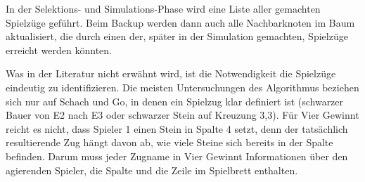 In der Selektions- und Simulations-Phase wird eine Liste aller gemachten Spielzüge geführt. Beim Backup werden dann auch alle Nachbarknoten im Baum aktualisiert, die durch einen der, später in der Simulation gemachten, Spielzüge erreicht werden könnten.

Was in der Literatur nicht erwähnt wird, ist die Notwendigkeit die Spielzüge eindeutig zu identifizieren. Die meisten Untersuchungen des Algorithmus beziehen sich nur auf Schach und Go, in denen ein Spielzug klar definiert ist (schwarzer Bauer von E2 nach E3 oder schwarzer Stein auf Kreuzung 3,3).
Für Vier Gewinnt reicht es nicht, dass Spieler 1 einen Stein in Spalte 4 setzt, denn der tatsächlich resultierende Zug hängt davon ab, wie viele Steine sich bereits in der Spalte befinden. Darum muss jeder Zugname in Vier Gewinnt Informationen über den agierenden Spieler, die Spalte und die Zeile im Spielbrett enthalten.

